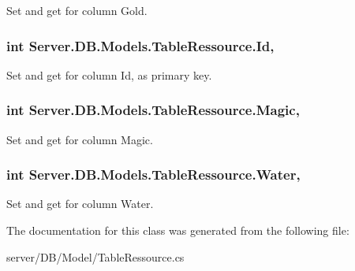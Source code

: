 Set and get for column Gold. 

\hypertarget{classServer_1_1DB_1_1Models_1_1TableRessource_a3109dbf5907383a8f3184a8709c41e8f}{
\subsubsection[{Id}]{\setlength{\rightskip}{0pt plus 5cm}int Server.\-D\-B.\-Models.\-Table\-Ressource.\-Id\hspace{0.3cm}{\ttfamily [get]}, {\ttfamily [set]}}}\label{classServer_1_1DB_1_1Models_1_1TableRessource_a3109dbf5907383a8f3184a8709c41e8f}


Set and get for column Id, as primary key. 

\hypertarget{classServer_1_1DB_1_1Models_1_1TableRessource_a2ec5a4252645f866d424376c1810f4fa}{
\subsubsection[{Magic}]{\setlength{\rightskip}{0pt plus 5cm}int Server.\-D\-B.\-Models.\-Table\-Ressource.\-Magic\hspace{0.3cm}{\ttfamily [get]}, {\ttfamily [set]}}}\label{classServer_1_1DB_1_1Models_1_1TableRessource_a2ec5a4252645f866d424376c1810f4fa}


Set and get for column Magic. 

\hypertarget{classServer_1_1DB_1_1Models_1_1TableRessource_ac1fa0d3ffbbff65d4f557d99030e5bba}{
\subsubsection[{Water}]{\setlength{\rightskip}{0pt plus 5cm}int Server.\-D\-B.\-Models.\-Table\-Ressource.\-Water\hspace{0.3cm}{\ttfamily [get]}, {\ttfamily [set]}}}\label{classServer_1_1DB_1_1Models_1_1TableRessource_ac1fa0d3ffbbff65d4f557d99030e5bba}


Set and get for column Water. 



The documentation for this class was generated from the following file\-:\begin{DoxyCompactItemize}
\item 
server/\-D\-B/\-Model/Table\-Ressource.\-cs\end{DoxyCompactItemize}
